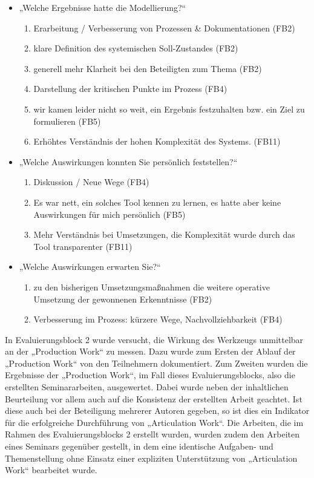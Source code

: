 \begin{itemize}
	\item „Welche Ergebnisse hatte die Modellierung?“
		\begin{enumerate}
			\item Erarbeitung / Verbesserung von Prozessen \& Dokumentationen (FB2)
			\item klare Definition des systemischen Soll‐Zustandes (FB2)
			\item generell mehr Klarheit bei den Beteiligten zum Thema (FB2)
			\item Darstellung der kritischen Punkte im Prozess (FB4)
			\item wir kamen leider nicht so weit, ein Ergebnis festzuhalten bzw. ein Ziel zu formulieren (FB5)
			\item Erhöhtes Verständnis der hohen Komplexität des Systems. (FB11) 
		\end{enumerate}
	\item „Welche Auswirkungen konnten Sie persönlich feststellen?“
		\begin{enumerate}
			\item Diskussion / Neue Wege (FB4)
			\item Es war nett, ein solches Tool kennen zu lernen, es hatte aber keine Auswirkungen für mich persönlich (FB5)
			\item Mehr Verständnis bei Umsetzungen, die Komplexität wurde durch das Tool transparenter (FB11) 
		\end{enumerate}
	\item „Welche Auswirkungen erwarten Sie?“
		\begin{enumerate}
			\item zu den bisherigen Umsetzungsmaßnahmen die weitere operative Umsetzung der gewonnenen Erkenntnisse (FB2)
			\item Verbesserung im Prozess: kürzere Wege, Nachvollziehbarkeit (FB4)
		\end{enumerate}
\end{itemize}

In Evaluierungsblock 2 wurde versucht, die Wirkung des Werkzeugs unmittelbar an der „Production Work“ zu messen. Dazu wurde zum Ersten der Ablauf der „Production Work“ von den Teilnehmern dokumentiert. Zum Zweiten wurden die Ergebnisse der „Production Work“, im Fall dieses Evaluierungsblocks, also die erstellten Seminararbeiten, ausgewertet. Dabei wurde neben der inhaltlichen Beurteilung vor allem auch auf die Konsistenz der erstellten Arbeit geachtet. Ist diese auch bei der Beteiligung mehrerer Autoren gegeben, so ist dies ein Indikator für die erfolgreiche Durchführung von „Articulation Work“. Die Arbeiten, die im Rahmen des Evaluierungsblocks 2 erstellt wurden, wurden zudem den Arbeiten eines Seminars gegenüber gestellt, in dem eine identische Aufgaben- und Themenstellung ohne Einsatz einer expliziten Unterstützung von „Articulation Work“ bearbeitet wurde.

